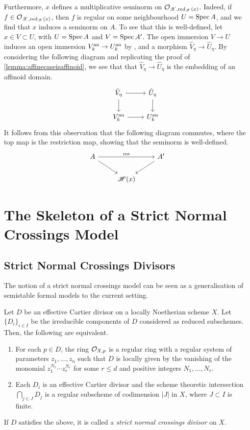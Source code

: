 Furthermore, $x$ defines a multiplicative seminorm on $\mathcal{O}_{\mathscr{X}, \operatorname{red}_{\mathscr{X}}(x)}$.
Indeed, if $f \in \mathcal{O}_{\mathscr{X}, \operatorname{red}_{\mathscr{X}}(x)}$, then $f$ is regular on some neighbourhood $U = \operatorname{Spec} A$, and we find that $x$ induces a seminorm on $A$.
To see that this is well-defined, let $x \in V \subset U$, with $U = \operatorname{Spec} A$ and $V = \operatorname{Spec} A'$.
The open immersion $V \to U$ induces an open immersion $V_k^{\text{an}} \to U_k^{\text{an}}$ by \parencite[Proposition 3.4.6]{berk1}, and a morphism $\hat{V}_{\eta} \to \hat{U}_{\eta}$.
By considering the following diagram and replicating the proof of \cref{lemma:affinecaseisaffinoid}, we see that that $\hat{V}_\eta \to \hat{U}_{\eta}$ is the embedding of an affinoid domain.
\[
\begin{tikzcd}
 & \hat{V}_{\eta} \arrow[r, overlay] \arrow[d, overlay] & \hat{U}_{\eta} \arrow[d, overlay] \\
 & \anl{V_k} \arrow[r, overlay] & \anl{U_k}
\end{tikzcd}
\]
It follows from this observation that the following diagram commutes, where the top map is the restriction map, showing that the seminorm is well-defined.
\[
\begin{tikzcd}
        A \arrow[dr, overlay] \arrow[rr,"\operatorname{res}", overlay] && A' \arrow[dl, overlay] \\
        & \resfield 
\end{tikzcd}    
\]

\section{The Skeleton of a Strict Normal Crossings Model}

\subsection{Strict Normal Crossings Divisors}

The notion of a strict normal crossings model can be seen as a generalisation of semistable formal models to the current setting.

\begin{defn}\parencite[Chapter 9, Definition 1.6]{liu}
    Let $D$ be an effective Cartier divisor on a locally Noetherian scheme $X$. Let $\{D_i\}_{i \in I}$ be the irreducible components of $D$ considered as reduced subschemes. Then, the following are equivalent.
    \begin{enumerate}
        \item For each $p \in D$, the ring $\mathcal{O}_{X, p}$ is a regular ring with a regular system of parameters $z_1, \dots, z_n$ such that $D$ is locally given by the vanishing of the monomial $z_1^{N_1} \cdots z_r^{N_r}$ for some $r \leq d$ and positive integers $N_1, \dots, N_r$.
        \item Each $D_i$ is an effective Cartier divisor and the scheme theoretic intersection $\bigcap_{j \in J} D_j$ is a regular subscheme of codimension $|J|$ in $X$, where $J \subset I$ is finite.
    \end{enumerate}
    If $D$ satisfies the above, it is called a \textit{strict normal crossings divisor} on $X$. 
\end{defn}

